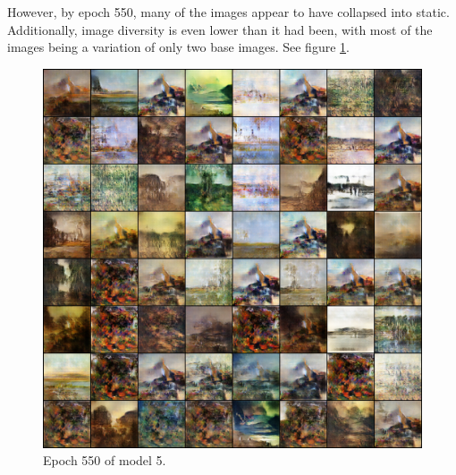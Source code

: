 \documentclass[11pt,letterpaper]{article}
\begin{document}
				However, by epoch 550, many of the images appear to have collapsed into static.
				Additionally, image diversity is even lower than it had been, with most of the images being a variation of only two base images.
				See figure \ref{fig:wa128:epoch550generator}.
				\begin{figure}
					\centering
					\includegraphics[width=1.0\linewidth]{results/model5/epoch550_generator}
					\caption{Epoch 550 of model 5.}
					\label{fig:wa128:epoch550generator}
				\end{figure}
\end{document}
